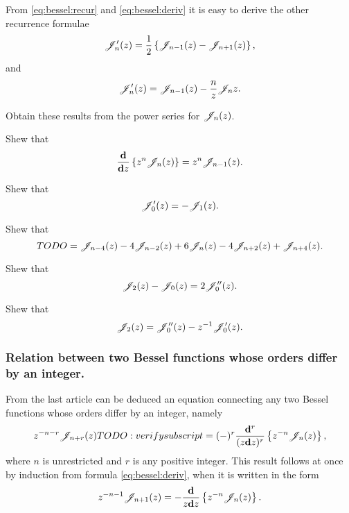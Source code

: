 \documentclass{book}
\begin{document}
From \eqref{eq:bessel:recur} and \eqref{eq:bessel:deriv} it is easy to
derive the other recurrence formulae
\begin{equation}
  \mathscr{J}'_{n}(z) = \frac{1}{2} \left\{  \mathscr{J}_{n-1}(z) - \mathscr{J}_{n+1}(z)   \right\},
\end{equation}
and
\begin{equation}
  \mathscr{J}'_{n}(z) = \mathscr{J}_{n-1}(z) - \frac{n}{z} \mathscr{J}_n{z}.
\end{equation}
\begin{wandwexample}
  Obtain these results from the power series for $\mathscr{J}_n(z)$.
\end{wandwexample}
\begin{wandwexample}
  Shew that 
  $$
  \frac{\mathbf{d}}{\mathbf{d} z} \left\{  z^n \mathscr{J}_n(z)  \right\} = z^n \mathscr{J}_{n-1}(z).
  $$
\end{wandwexample}
\begin{wandwexample}
  Shew that
  $$
  \mathscr{J}'_0(z) = -\mathscr{J}_1(z).
  $$
\end{wandwexample}
\begin{wandwexample}
  Shew that
  $$
  TODO = \mathscr{J}_{n-4}(z) - 4 \mathscr{J}_{n-2}(z) + 6 \mathscr{J}_n(z) - 4 \mathscr{J}_{n+2}(z) + \mathscr{J}_{n+4}(z).
  $$
\end{wandwexample}
\begin{wandwexample}
  Shew that
  $$
  \mathscr{J}_2(z) - \mathscr{J}_0(z) = 2 \mathscr{J}''_0(z).
  $$
\end{wandwexample}
\begin{wandwexample}
  Shew that
  $$
  \mathscr{J}_2(z) = \mathscr{J}''_0(z) - z^{-1} \mathscr{J}'_0(z).
  $$
\end{wandwexample}

\subsubsection{Relation between two Bessel functions whose orders
  differ by an integer.}
From the last article can be deduced an equation connecting any two
Bessel functions whose orders differ by an integer, namely
$$
z^{-n-r} \mathscr{J}_{n+r}(z) TODO: verify subscript
=
(-)^r
\frac{\mathbf{d}^r}{ (z \mathbf{d} z)^r }
\left\{  z^{-n} \mathscr{J}_n(z)   \right\},
$$
where $n$ is unrestricted and $r$ is any positive integer. This result
follows at once by induction from formula \eqref{eq:bessel:deriv},
when it is written in the form
$$
z^{-n-1} \mathscr{J}_{n+1}(z) 
=
- \frac{\mathbf{d}}{z \mathbf{d} z}
\left\{  z^{-n} \mathscr{J}_n(z)   \right\}.
$$
\end{document}
